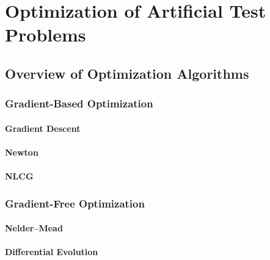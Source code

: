 
\chapter{Optimization of Artificial Test Problems}


\section{Overview of Optimization Algorithms}


\subsection{Gradient-Based Optimization}


\subsubsection{Gradient Descent}


\subsubsection{Newton}


\subsubsection{NLCG}


\subsection{Gradient-Free Optimization}


\subsubsection{Nelder--Mead}


\subsubsection{Differential Evolution}

